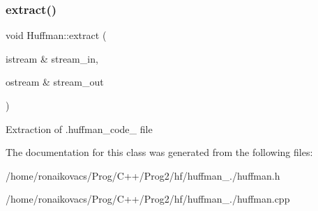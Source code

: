 \subsubsection{\texorpdfstring{extract()}{extract()}}
{\footnotesize\ttfamily void Huffman\+::extract (\begin{DoxyParamCaption}\item[{istream \&}]{stream\+\_\+in,  }\item[{ostream \&}]{stream\+\_\+out }\end{DoxyParamCaption})}

Extraction of .huffman\+\_\+code\+\_\+ file 

The documentation for this class was generated from the following files\+:\begin{DoxyCompactItemize}
\item 
/home/ronaikovacs/\+Prog/\+C++/\+Prog2/hf/huffman\+\_./huffman.\+h\item 
/home/ronaikovacs/\+Prog/\+C++/\+Prog2/hf/huffman\+\_./huffman.\+cpp\end{DoxyCompactItemize}

